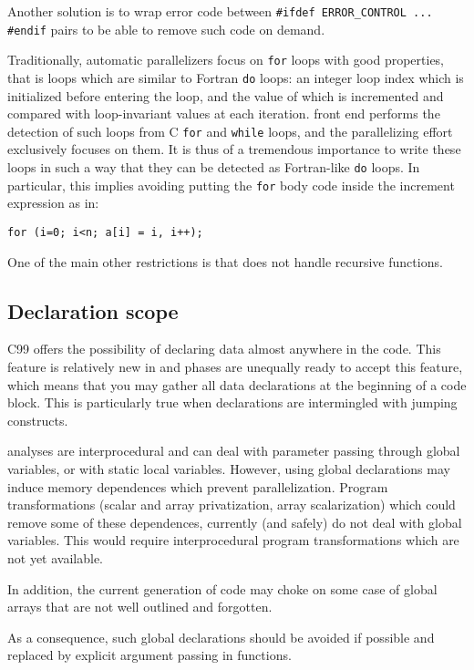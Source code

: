 \documentclass[a4paper]{article}
\begin{document}
Another solution is to wrap error code between %
\lstinline|#ifdef ERROR_CONTROL ... #endif| pairs to be able to
remove such code on demand.


Traditionally, automatic parallelizers focus on \texttt{for} loops
with good properties, that is loops which are similar to Fortran
\texttt{do} loops: an integer loop index which is initialized before
entering the loop, and the value of which is incremented and compared
with loop-invariant values at each iteration. \Apips front end
performs the detection of such loops from C \texttt{for} and
\texttt{while} loops, and the parallelizing effort exclusively focuses
on them. It is thus of a tremendous importance to write these loops in
such a way that they can be detected as Fortran-like \texttt{do}
loops. In particular, this implies avoiding putting the \texttt{for}
body code inside the increment expression as in:
\begin{lstlisting}
for (i=0; i<n; a[i] = i, i++);
\end{lstlisting}


One of the main other restrictions is that \Apips does not handle
recursive functions.


\subsection{Declaration scope}
\label{sec:declaration-scope}

C99 offers the possibility of declaring data almost anywhere in the
code. This feature is relatively new in \Apips and phases are
unequally ready to accept this feature, which means that you may
gather all data declarations at the beginning of a code block. This is
particularly true when declarations are intermingled with jumping
constructs.

\Apips analyses are interprocedural and can deal with parameter
passing through global variables, or with static local
variables. However, using global declarations may induce memory
dependences which prevent parallelization. Program transformations
(scalar and array privatization, array scalarization) which could
remove some of these dependences, currently (and safely) do not deal
with global variables. This would require interprocedural program
transformations which are not yet available.

In addition, the current generation of \Agpu code may choke on some
case of global arrays that are not well outlined and forgotten.

As a consequence, such global declarations should be avoided if
possible and replaced by explicit argument passing in functions.
\end{document}
